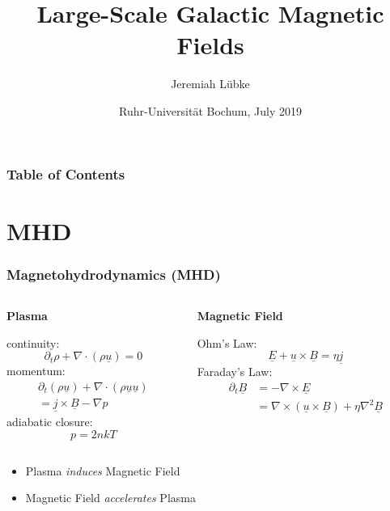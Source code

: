 \documentclass[mathserif]{beamer}
\title{Large-Scale Galactic Magnetic Fields}
\author{Jeremiah Lübke}
\date{Ruhr-Universität Bochum, July 2019}
\newcommand{\partt}{\partial_{t}}
\newcommand{\Div}{\nabla\cdot}
\newcommand{\Grad}{\nabla}
\newcommand{\Curl}{\nabla\times}
\newcommand{\Lap}{\nabla^{2}}
\newcommand{\uvec}{\underline{u}}
\newcommand{\jvec}{\underline{j}}
\newcommand{\Bvec}{\underline{B}}
\newcommand{\Evec}{\underline{E}}
\begin{document}
\setlength{\abovedisplayskip}{6pt}
\setlength{\belowdisplayskip}{6pt}


\frame{\titlepage}

\begin{frame}
    \frametitle{Table of Contents}
    \tableofcontents
\end{frame}


\section{MHD}
\begin{frame}
    \frametitle{Magnetohydrodynamics (MHD)}
    \begin{columns}[T]
        \begin{column}[T]{.5\textwidth}
            \begin{tcolorbox}
            \begin{center}
                \textbf{Plasma}
            \end{center}
            continuity: \[\partt\rho+\Div(\rho\uvec)=0\]
            momentum:
            \begin{align*}
                \partt(\rho\uvec)+\Div(\rho\uvec\uvec) \\
                =\jvec\times\Bvec-\Grad{p}
            \end{align*}
            adiabatic closure: \[p=2nkT\]
            \end{tcolorbox}
        \end{column}

        \begin{column}[T]{.5\textwidth}
            \begin{tcolorbox}
            \begin{center}
                \textbf{Magnetic Field}
            \end{center}
            Ohm's Law: \[\Evec+\uvec\times\Bvec=\eta\jvec\]
            Faraday's Law:
            \begin{align*}
                \partt\Bvec&=-\Curl\Evec \\
                &=\Curl(\uvec\times\Bvec)+\eta\Lap\Bvec
            \end{align*}
            \end{tcolorbox}
        \end{column}
    \end{columns}
    \medskip
    \begin{itemize}
        \item Plasma \emph{induces} Magnetic Field
        \item Magnetic Field \emph{accelerates} Plasma
    \end{itemize}
\end{frame}
\end{document}
